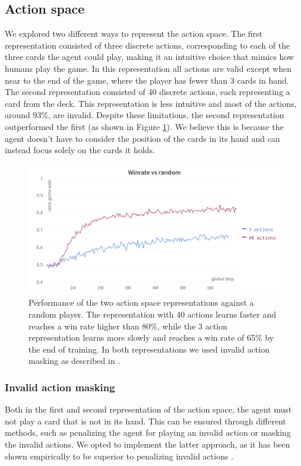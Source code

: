 \subsection{Action space}

We explored two different ways to represent the action space. The first representation consisted of three discrete actions, corresponding to each of the three cards the agent could play, making it an intuitive choice that mimics how humans play the game. In this representation all actions are valid except when near to the end of the game, where the player has fewer than 3 cards in hand. The second representation consisted of 40 discrete actions, each representing a card from the deck. This representation is less intuitive and most of the actions, around 93\%, are invalid. Despite these limitations, the second representation outperformed the first (as shown in Figure \ref{fig:action-space-comparison}). We believe this is because the agent doesn't have to consider the position of the cards in its hand and can instead focus solely on the cards it holds.
\begin{figure}[H]
    \centering
    \includegraphics[width=\textwidth]{images/action-spaces-comparison.png}
    \caption{Performance of the two action space representations against a random player. The representation with 40 actions learns faster and reaches a win rate higher than 80\%, while the 3 action representation learns more slowly and reaches a win rate of 65\% by the end of training. In both representations we used invalid action masking as described in \cite{action-masking}.}
    \label{fig:action-space-comparison}
\end{figure}

\subsubsection{Invalid action masking}
Both in the first and second representation of the action space, the agent must not play a card that is not in its hand. This can be ensured through different methods, such as penalizing the agent for playing an invalid action or masking the invalid actions. We opted to implement the latter approach, as it has been shown empirically to be superior to penalizing invalid actions \cite{action-masking}.

